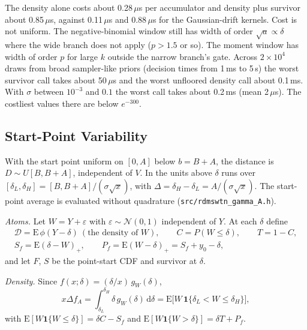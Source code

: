 \documentclass[12pt]{article}
\newcommand{\dd}{\,\mathrm{d}}
\newcommand{\Normal}{\mathcal{N}}
\newcommand{\phiN}{\phi}
\begin{document}
The density alone costs about 0.28\,$\mu$s per accumulator and density plus survivor about 0.85\,$\mu$s, against 0.11\,$\mu$s and
0.88\,$\mu$s for the Gaussian-drift kernels. Cost is not uniform. The
negative-binomial window still has width of order $\sqrt a\propto\delta$ where the wide branch does not apply ($p>1.5$ or so). The moment window has width of order $p$ for large $k$ outside the narrow branch's gate. Across $2\times10^4$ draws from broad sampler-like priors (decision times from 1\,ms to 5\,s) the worst survivor call takes about 50\,$\mu$s and the worst unfloored density call about 0.1\,ms. With $\sigma$ between $10^{-3}$ and $0.1$ the worst call takes about 0.2\,ms (mean 2\,$\mu$s). The costliest values there are below $e^{-300}$.

\subsection{Start-Point Variability}
\label{sec:gamma-drift-A}
With the start point uniform on $[0,A]$ below $b=B+A$, the distance is $D\sim U[B,B+A]$, independent of $V$. In the units above $\delta$ runs over $[\delta_L,\delta_H]=[B,B+A]/(\sigma\sqrt x)$, with $\Delta=\delta_H-\delta_L=A/(\sigma\sqrt x)$. The start-point average is evaluated without quadrature (\texttt{src/rdmswtn\_gamma\_A.h}).

\emph{Atoms.} Let $W=Y+\varepsilon$ with $\varepsilon\sim\Normal(0,1)$ independent of $Y$. At each $\delta$ define
\begin{gather*}
  \mathcal D=\mathrm E\,\phiN(Y-\delta)\ (\text{the density of }W),\qquad
  C=P(W\le\delta),\qquad T=1-C,\\
  S_f=\mathrm E(\delta-W)_+,\qquad P_f=\mathrm E(W-\delta)_+=S_f+y_0-\delta,
\end{gather*}
and let $F$, $S$ be the point-start CDF and survivor at $\delta$.

\emph{Density.} Since $f(x;\delta)=(\delta/x)\,g_W(\delta)$,
\begin{equation}
  x\Delta f_A=\int_{\delta_L}^{\delta_H}\delta\,g_W(\delta)\dd\delta
  =\mathrm E\bigl[W\,\mathbf 1\{\delta_L<W\le\delta_H\}\bigr],
\end{equation}
with $\mathrm E[W\mathbf 1\{W\le\delta\}]=\delta C-S_f$ and $\mathrm E[W\mathbf 1\{W>\delta\}]=\delta T+P_f$.
\end{document}

